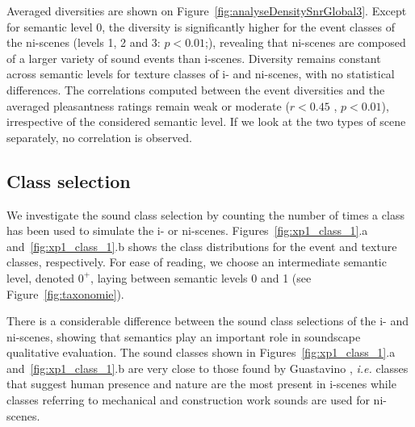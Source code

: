 \documentclass[twoside,twocolumn]{article}
\begin{document}
Averaged diversities are shown on Figure~\ref{fig:analyseDensitySnrGlobal3}. Except for semantic level 0, the diversity is significantly higher for the event classes of the ni-scenes (levels 1, 2 and 3: $p<0.01$;), revealing that ni-scenes are composed of a larger variety of sound events than i-scenes. Diversity remains constant across semantic levels for texture classes of i- and ni-scenes, with no statistical differences.   The correlations computed between the event diversities and the averaged pleasantness ratings remain weak or moderate ($r<0.45$  , $p<0.01$), irrespective of the considered semantic level.  If we look at the two types of scene separately, no correlation is observed. 


\subsection{Class selection}
\label{sec:classSelection}

We investigate the sound class selection by counting the number of times a class has been used to simulate the i- or ni-scenes. Figures~\ref{fig:xp1_class_1}.a and~\ref{fig:xp1_class_1}.b  shows the class distributions for the event and texture classes, respectively. For ease of reading, we choose an intermediate semantic level, denoted $0^{+}$, laying between semantic levels 0 and 1 (see Figure~\ref{fig:taxonomie}).

There is a considerable difference between the sound class selections of the i- and ni-scenes, showing that semantics play an important role in soundscape qualitative evaluation. The sound classes shown in Figures~\ref{fig:xp1_class_1}.a and~\ref{fig:xp1_class_1}.b are very close to those found by Guastavino \cite{guastavino_ideal_2006}, \textit{i.e.} classes that suggest human presence and nature are the most present in i-scenes while classes referring to mechanical and construction work sounds are used for ni-scenes.
\end{document}

